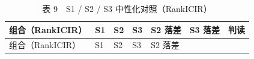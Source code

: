 \documentclass[UTF8,a4paper,zihao=-4,fontset=windows]{ctexart}
\begin{document}
\begin{longtable}[]{@{}
  >{\raggedright\arraybackslash}p{}
  >{\raggedright\arraybackslash}p{}
  >{\raggedright\arraybackslash}p{}
  >{\raggedright\arraybackslash}p{}
  >{\raggedright\arraybackslash}p{}
  >{\raggedright\arraybackslash}p{}
  >{\raggedright\arraybackslash}p{}@{}}
\caption{表 9　S1 / S2 / S3 中性化对照（RankICIR）}\tabularnewline
\toprule\noalign{}
\begin{minipage}[b]{\linewidth}\raggedright
组合（RankICIR）
\end{minipage} & \begin{minipage}[b]{\linewidth}\raggedright
S1
\end{minipage} & \begin{minipage}[b]{\linewidth}\raggedright
S2
\end{minipage} & \begin{minipage}[b]{\linewidth}\raggedright
S3
\end{minipage} & \begin{minipage}[b]{\linewidth}\raggedright
S2 落差
\end{minipage} & \begin{minipage}[b]{\linewidth}\raggedright
S3 落差
\end{minipage} & \begin{minipage}[b]{\linewidth}\raggedright
判读
\end{minipage} \\
\midrule\noalign{}
\endfirsthead
\toprule\noalign{}
\begin{minipage}[b]{\linewidth}\raggedright
组合（RankICIR）
\end{minipage} & \begin{minipage}[b]{\linewidth}\raggedright
S1
\end{minipage} & \begin{minipage}[b]{\linewidth}\raggedright
S2
\end{minipage} & \begin{minipage}[b]{\linewidth}\raggedright
S3
\end{minipage} & \begin{minipage}[b]{\linewidth}\raggedright
S2 落差
\end{minipage} & \begin{minipage}[b]{\linewidth}\raggedright

\end{minipage}
\end{longtable}
\end{document}
